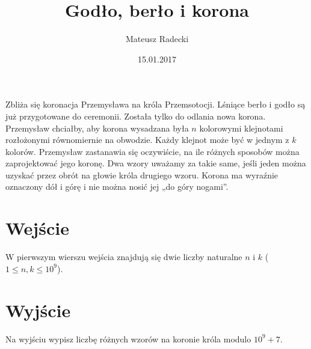 \documentclass[zad,zawodnik,utf8]{sinol}
\title{Godło, berło i korona}
\author{Mateusz Radecki} %
\date{15.01.2017}
\begin{document}
\begin{tasktext}%

Zbliża się koronacja Przemysława na króla Przemsotocji. Lśniące berło i godło są już przygotowane do ceremonii. Została tylko do odlania nowa korona. Przemysław chciałby, aby korona wysadzana była $n$ kolorowymi klejnotami rozłożonymi równomiernie na obwodzie. Każdy klejnot może być w jednym z $k$ kolorów. Przemysław zastanawia się oczywiście, na ile różnych sposobów można zaprojektować jego koronę. Dwa wzory uważamy za takie same, jeśli jeden można uzyskać przez obrót na głowie króla drugiego wzoru. Korona ma wyraźnie oznaczony dół i górę i nie można nosić jej „do góry nogami”.

  \section{Wejście}
W pierwszym wierszu wejścia znajdują się dwie liczby naturalne $n$ i $k$ ($1 \leq n,k \leq 10^9$).

  \section{Wyjście}
Na wyjściu wypisz liczbę różnych wzorów na koronie króla modulo $10^9+7$.
  
\makecompactexample

\end{tasktext}
\end{document}

